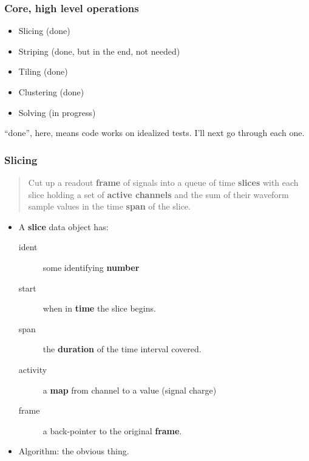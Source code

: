 \documentclass[xcolor=dvipsnames]{beamer}
\begin{document}
\begin{frame}
  \frametitle{Core, high level operations}
  \begin{itemize}
  \item Slicing (done)
  \item Striping (done, but in the end, not needed)
  \item Tiling (done)
  \item Clustering (done)
  \item Solving (in progress)
  \end{itemize}
  \vfill
  ``done'', here, means code works on idealized tests.
  \vfill
  I'll next go through each one.
\end{frame}

\begin{frame}
  \frametitle{Slicing}
  \begin{quote}
    Cut up a readout \textbf{frame} of signals into a queue of time \textbf{slices} with each slice holding a set of \textbf{active channels} and the sum of their waveform sample values in the time \textbf{span} of the slice.
  \end{quote}


  \begin{itemize}
  \item A \textbf{slice} data object has:
    \begin{description}
    \item[ident] some identifying \textbf{number}
    \item[start] when in \textbf{time} the slice begins.
    \item[span] the \textbf{duration} of the time interval covered.
    \item[activity] a \textbf{map} from channel to a value (signal charge)
    \item[frame] a back-pointer to the original \textbf{frame}. 
    \end{description}
  \item Algorithm: the obvious thing.
  \end{itemize}
\end{frame}
\end{document}
